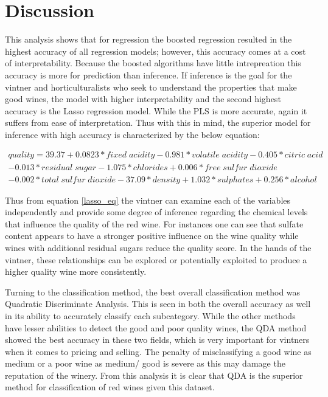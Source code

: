 \documentclass[]{article}
\begin{document}
\section{Discussion}\label{discussion}

This analysis shows that for regression the boosted regression resulted
in the highest accuracy of all regression models; however, this accuracy
comes at a cost of interpretability. Because the boosted algorithms have
little intrepreation this accuracy is more for prediction than
inference. If inference is the goal for the vintner and
horticulturalists who seek to understand the properties that make good
wines, the model with higher interpretability and the second highest
accuracy is the Lasso regression model. While the PLS is more accurate,
again it suffers from ease of interpretation. Thus with this in mind,
the superior model for inference with high accuracy is characterized by
the below equation:\linebreak

\begin{equation}
\begin{aligned}
\label{lasso_eq}
quality = 39.37 + 0.0823 * fixed\;acidity -0.981 * volatile\;acidity -0.405 * citric\;acid \\
-0.013 *residual\;sugar -1.075 * chlorides + 0.006 * free\;sulfur\;dioxide\\
- 0.002 * total\;sulfur\;dioxide - 37.09 * density +1.032 * sulphates + 0.256 * alcohol
\end{aligned}
\end{equation}

Thus from equation \ref{lasso_eq} the vintner can examine each of the
variables independently and provide some degree of inference regarding
the chemical levels that influence the quality of the red wine. For
instances one can see that sulfate content appears to have a stronger
positive influence on the wine quality while wines with additional
residual sugars reduce the quality score. In the hands of the vintner,
these relationships can be explored or potentially exploited to produce
a higher quality wine more consistently. \linebreak

Turning to the classification method, the best overall classification
method was Quadratic Discriminate Analysis. This is seen in both the
overall accuracy as well in its ability to accurately classify each
subcategory. While the other methods have lesser abilities to detect the
good and poor quality wines, the QDA method showed the best accuracy in
these two fields, which is very important for vintners when it comes to
pricing and selling. The penalty of misclassifying a good wine as medium
or a poor wine as medium/ good is severe as this may damage the
reputation of the winery. From this analysis it is clear that QDA is the
superior method for classification of red wines given this dataset.
\end{document}
